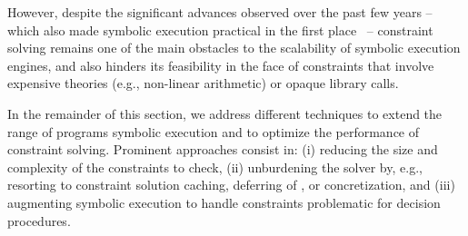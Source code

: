 


However, despite the significant advances observed over the past few years -- which also made symbolic execution practical in the first place~\cite{CS-CACM13} -- constraint solving remains one of the main obstacles to the scalability of symbolic execution engines, and also hinders its feasibility in the face of constraints that involve expensive theories (e.g., non-linear arithmetic) or opaque library calls.


In the remainder of this section, we address different techniques to extend the range of programs  symbolic execution and to optimize the performance of constraint solving. Prominent approaches consist in: (i) reducing the size and complexity of the constraints to check, (ii) unburdening the solver by, e.g., resorting to constraint solution caching, deferring of , or concretization, and (iii) augmenting symbolic execution to handle constraints problematic for decision procedures.

